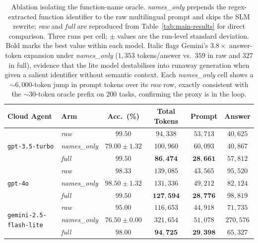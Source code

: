 \documentclass[11pt,a4paper,twocolumn]{article}
\begin{document}
\begin{table}[t]
\centering
\small
\setlength{\tabcolsep}{4pt}
\begin{tabular}{llcccc}
\toprule
\textbf{Cloud Agent} & \textbf{Arm} & \textbf{Acc.\ (\%)} & \textbf{Total Tokens} & \textbf{Prompt} & \textbf{Answer} \\
\midrule
\multirow{3}{*}{\texttt{gpt-3.5-turbo}}        & \textit{raw}         & $99.50$           & $94{,}338$           & $53{,}713$           & $40{,}625$ \\
                                               & \textit{names\_only} & $79.00 \pm 1.32$  & $100{,}960$          & $60{,}093$           & $40{,}867$ \\
                                               & \textit{full}        & $\mathbf{99.50}$  & $\mathbf{86{,}474}$  & $\mathbf{28{,}661}$  & $57{,}812$ \\
\midrule
\multirow{3}{*}{\texttt{gpt-4o}}               & \textit{raw}         & $98.33$           & $139{,}085$          & $43{,}565$           & $95{,}520$ \\
                                               & \textit{names\_only} & $98.50 \pm 1.32$  & $131{,}336$          & $49{,}212$           & $82{,}124$ \\
                                               & \textit{full}        & $\mathbf{99.50}$  & $\mathbf{127{,}594}$ & $\mathbf{28{,}776}$  & $98{,}819$ \\
\midrule
\multirow{3}{*}{\texttt{gemini-2.5-flash-lite}}& \textit{raw}         & $95.00$           & $116{,}653$          & $44{,}918$           & $71{,}735$ \\
                                               & \textit{names\_only} & $76.50 \pm 0.00$  & $321{,}654$          & $51{,}078$           & $\mathit{270{,}576}$ \\
                                               & \textit{full}        & $\mathbf{98.00}$  & $\mathbf{94{,}725}$  & $\mathbf{29{,}398}$  & $65{,}327$ \\
\bottomrule
\end{tabular}
\caption{Ablation isolating the function-name oracle. \textit{names\_only} prepends the regex-extracted function identifier to the raw multilingual prompt and skips the SLM rewrite; \textit{raw} and \textit{full} are reproduced from Table~\ref{tab:main-results} for direct comparison. Three runs per cell; $\pm$ values are the run-level standard deviation. Bold marks the best value within each model. Italic flags Gemini's $3.8\times$ answer-token expansion under \textit{names\_only} ($1{,}353$ tokens/answer vs.\ $359$ in raw and $327$ in full), evidence that the lite model destabilises into runaway generation when given a salient identifier without semantic context. Each \textit{names\_only} cell shows a $\sim$$6{,}000$-token jump in prompt tokens over its \textit{raw} row, exactly consistent with the $\sim$$30$-token oracle prefix on $200$ tasks, confirming the proxy is in the loop.}
\label{tab:ablation}
\end{table}
\end{document}

